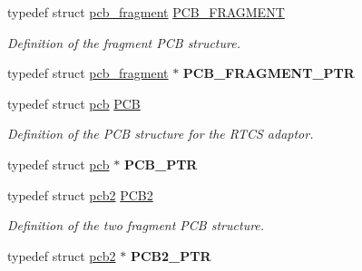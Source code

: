 \begin{DoxyCompactItemize}
\item 
typedef struct \hyperlink{structpcb__fragment}{pcb\+\_\+fragment} \hyperlink{group__enet__rtcs__adaptor_gab13091728cbbfc60133eca38ad2bbccc}{P\+C\+B\+\_\+\+F\+R\+A\+G\+M\+E\+NT}\hypertarget{group__enet__rtcs__adaptor_gab13091728cbbfc60133eca38ad2bbccc}{}\label{group__enet__rtcs__adaptor_gab13091728cbbfc60133eca38ad2bbccc}

\begin{DoxyCompactList}\small\item\em Definition of the fragment P\+CB structure. \end{DoxyCompactList}\item 
typedef struct \hyperlink{structpcb__fragment}{pcb\+\_\+fragment} $\ast$ {\bfseries P\+C\+B\+\_\+\+F\+R\+A\+G\+M\+E\+N\+T\+\_\+\+P\+TR}\hypertarget{group__enet__rtcs__adaptor_gad85fded8fff6c9db6b48c66a483d6f1b}{}\label{group__enet__rtcs__adaptor_gad85fded8fff6c9db6b48c66a483d6f1b}

\item 
typedef struct \hyperlink{structpcb}{pcb} \hyperlink{group__enet__rtcs__adaptor_ga938e427dbd7e47ad2b2659ae0de7c662}{P\+CB}\hypertarget{group__enet__rtcs__adaptor_ga938e427dbd7e47ad2b2659ae0de7c662}{}\label{group__enet__rtcs__adaptor_ga938e427dbd7e47ad2b2659ae0de7c662}

\begin{DoxyCompactList}\small\item\em Definition of the P\+CB structure for the R\+T\+CS adaptor. \end{DoxyCompactList}\item 
typedef struct \hyperlink{structpcb}{pcb} $\ast$ {\bfseries P\+C\+B\+\_\+\+P\+TR}\hypertarget{group__enet__rtcs__adaptor_ga99c4564be40accd2e95d76dbba1bc397}{}\label{group__enet__rtcs__adaptor_ga99c4564be40accd2e95d76dbba1bc397}

\item 
typedef struct \hyperlink{structpcb2}{pcb2} \hyperlink{group__enet__rtcs__adaptor_ga81e792bba9b8bca2f6222b1bf9119707}{P\+C\+B2}\hypertarget{group__enet__rtcs__adaptor_ga81e792bba9b8bca2f6222b1bf9119707}{}\label{group__enet__rtcs__adaptor_ga81e792bba9b8bca2f6222b1bf9119707}

\begin{DoxyCompactList}\small\item\em Definition of the two fragment P\+CB structure. \end{DoxyCompactList}\item 
typedef struct \hyperlink{structpcb2}{pcb2} $\ast$ {\bfseries P\+C\+B2\+\_\+\+P\+TR}\hypertarget{group__enet__rtcs__adaptor_ga8c64b4894bdf13095195d94050059c6f}{}\label{group__enet__rtcs__adaptor_ga8c64b4894bdf13095195d94050059c6f}


\end{DoxyCompactItemize}
